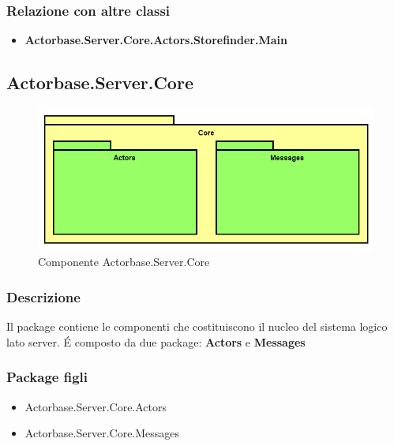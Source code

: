 \documentclass[a4paper]{article}
\begin{document}
			\subsubsection{Relazione con altre classi}
			\begin{itemize}
				\item \textbf{Actorbase.Server.Core.Actors.Storefinder.Main} 
			\end{itemize}
			
		\subsection{Actorbase.Server.Core}
			\begin{figure} [H]
			\centering
			\includegraphics[scale=0.55]{Server/Package/CoreLevel.png}
			\caption{Componente Actorbase.Server.Core}
			\end{figure}
			\subsubsection{Descrizione}
				Il package contiene le componenti che costituiscono il nucleo del sistema logico lato server. \'E composto da due package: \textbf{Actors} e \textbf{Messages}
			\subsubsection{Package figli}
			\begin{itemize}
				\item Actorbase.Server.Core.Actors
				\item Actorbase.Server.Core.Messages
			\end{itemize}
			
\end{document}
